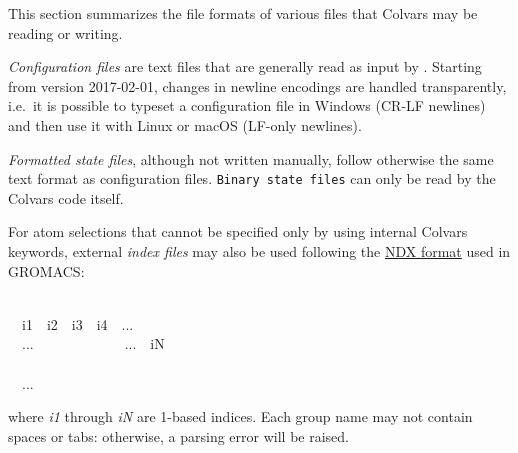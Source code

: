 



This section summarizes the file formats of various files that Colvars may be reading or writing.


\emph{Configuration files} are text files that are generally read as input by \MDENGINE{}.
Starting from version 2017-02-01, changes in newline encodings are handled transparently, i.e.\ it is possible to typeset a configuration file in Windows (CR-LF newlines) and then use it with Linux or macOS (LF-only newlines).

\emph{Formatted state files}, although not written manually, follow otherwise the same text format as configuration files.  \texttt{Binary state files} can only be read by the Colvars code itself.



For atom selections that cannot be specified only by using internal Colvars keywords, external \emph{index files} may also be used following the \href{http://manual.gromacs.org/documentation/current/reference-manual/file-formats.html\#ndx}{NDX format} used in GROMACS:
\begin{datafileexample}
\\
\-~~i1~~i2~~i3~~i4~~...\\
\-~~...~~~~~~~~~~~~~...~~iN\\
\\
\-~~...
\end{datafileexample}
\noindent{}where \emph{i1} through \emph{iN} are 1-based indices.  Each group name may not contain spaces or tabs: otherwise, a parsing error will be raised.

